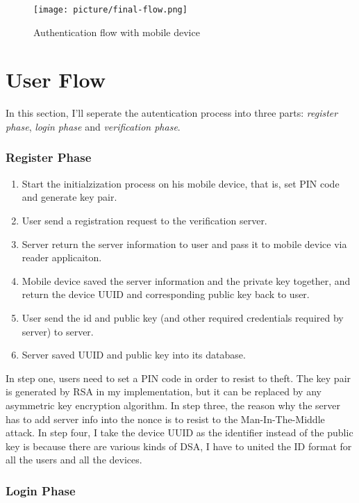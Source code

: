 \begin{CJK}{Bg5}{bsmi}
\begin{figure}
\centering
\label{fig:final-flow}
\texttt{[image: picture/final-flow.png]}
\caption{Authentication flow with mobile device}
\end{figure}

\section{User Flow}

In this section, I'll seperate the autentication process into three parts: \emph{register phase}, \emph{login phase} and \emph{verification phase}.

\subsubsection{Register Phase}

\begin{enumerate}
\item Start the initialzization process on his mobile device, that is, set PIN code and generate key pair.
\item User send a registration request to the verification server.
\item Server return the server information to user and pass it to mobile device via reader applicaiton.
\item Mobile device saved the server information and the private key together, and return the device UUID and corresponding public key back to user.
\item User send the id and public key (and other required credentials required by server) to server.
\item Server saved UUID and public key into its database.
\end{enumerate}

In step one, users need to set a PIN code in order to resist to theft. The key pair is generated by RSA in my implementation, but it can be replaced by any asymmetric key encryption algorithm. In step three, the reason why the server has to add server info into the nonce is to resist to the Man-In-The-Middle attack. In step four, I take the device UUID as the identifier instead of the public key is because there are various kinds of DSA, I have to united the ID format for all the users and all the devices.

\subsubsection{Login Phase}


\end{CJK}
